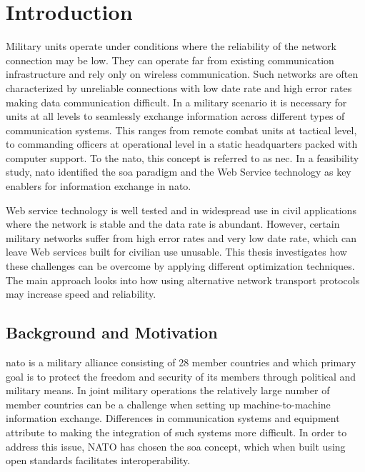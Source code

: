 \chapter{Introduction}

Military units operate under conditions where the reliability of the network
connection may be low. They can operate far from existing communication
infrastructure and rely only on wireless communication. Such networks are often
characterized by unreliable connections with low date rate and high error rates
making data communication difficult. In a military scenario it is necessary for
units at all levels to seamlessly exchange information across different types of
communication systems. This ranges from remote combat units at tactical level,
to commanding officers at operational level in a static headquarters packed with
computer support. To the \gls{nato}, this concept is referred to as \gls{nec}.
In a feasibility study, \gls{nato} identified the \gls{soa} paradigm and the Web
Service technology as key enablers for information exchange in
\gls{nato}\cite{nnec-study}.

Web service technology is well tested and in widespread use in civil
applications where the network is stable and the data rate is abundant. However,
certain military networks suffer from high error rates and very low date rate,
which can leave Web services built for civilian use unusable. This thesis
investigates how these challenges can be overcome by applying  different
optimization techniques. The main approach looks into how using alternative
network transport protocols may increase speed and reliability.


\section{Background and Motivation}

\gls{nato} is a military alliance consisting of 28 member countries
\cite{nato-homepage-member-countries} and which primary goal is to protect the
freedom and security of its members through political and military means. In
joint military operations the relatively large number of member countries can be
a challenge when setting up machine-to-machine information exchange. Differences
in communication systems and equipment attribute to making the integration of
such systems more difficult. In order to address this issue, NATO has chosen the
\gls{soa} concept, which when built using open standards facilitates
interoperability\cite{nnec-study}.

